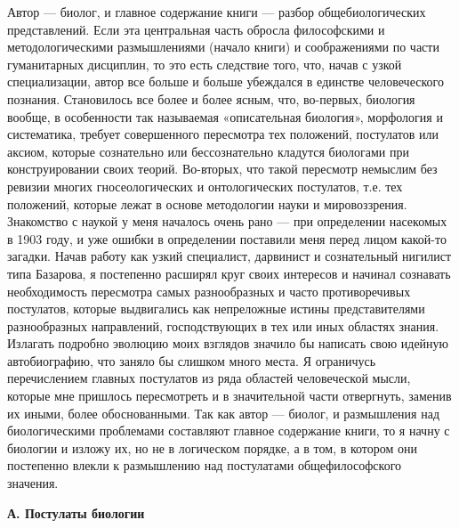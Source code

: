 Автор   ---   биолог,   и   главное  содержание   книги   ---   разбор
общебиологических  представлений. Если  эта центральная  часть обросла
философскими  и  методологическими   размышлениями  (начало  книги)  и
соображениями по  части гуманитарных дисциплин, то  это есть следствие
того,  что, начав  с узкой  специализации, автор  все больше  и больше
убеждался в  единстве человеческого познания. Становилось  все более и
более  ясным,  что,  во-первых,  биология вообще,  в  особенности  так
называемая «описательная биология»,  морфология и систематика, требует
совершенного пересмотра тех положений,  постулатов или аксиом, которые
сознательно или бессознательно  кладутся биологами при конструировании
своих  теорий. Во-вторых,  что  такой пересмотр  немыслим без  ревизии
многих   гносеологических  и   онтологических  постулатов,   т.е.  тех
положений, которые  лежат в основе методологии  науки и мировоззрения.
Знакомство с  наукой у  меня началось очень  рано ---  при определении
насекомых в 1903 году, и уже ошибки в определении поставили меня перед
лицом какой-то загадки. Начав работу как узкий специалист, дарвинист и
сознательный  нигилист  типа  Базарова,  я  постепенно  расширял  круг
своих  интересов и  начинал сознавать  необходимость пересмотра  самых
разнообразных и  часто противоречивых постулатов,  которые выдвигались
как  непреложные  истины  представителями  разнообразных  направлений,
господствующих  в  тех или  иных  областях  знания. Излагать  подробно
эволюцию моих взглядов значило бы написать свою идейную автобиографию,
что заняло бы слишком много  места. Я ограничусь перечислением главных
постулатов из  ряда областей человеческой мысли,  которые мне пришлось
пересмотреть  и в  значительной  части отвергнуть,  заменив их  иными,
более  обоснованными. Так  как  автор ---  биолог,  и размышления  над
биологическими проблемами  составляют главное  содержание книги,  то я
начну  с  биологии и  изложу  их,  но не  в  логическом  порядке, а  в
том, в  котором они  постепенно влекли  к размышлению  над постулатами
общефилософского значения.

\begin{center}
  \textbf{А. Постулаты биологии}
\end{center}

